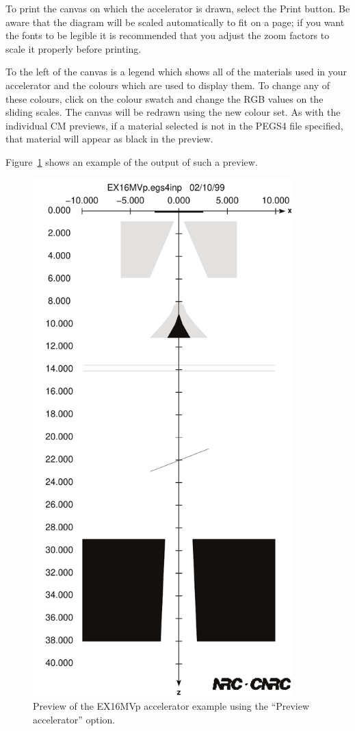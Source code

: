 \documentclass[12pt,twoside]{article}
\begin{document}
To print the canvas on which the accelerator is drawn, select the {\sf
Print} button.  Be aware that the diagram will be scaled
automatically to fit on a page; if you want the fonts to be legible it
is recommended that you adjust the zoom factors to scale it properly
before printing.

To the left of the canvas is a legend which shows all of the materials
used in your accelerator and the colours which are used to display
them.  To change any of these colours, click on the colour swatch and
change the RGB values on the sliding scales.  The canvas will be redrawn
using the new colour set.  As with the individual CM previews, if a
material selected is not in the PEGS4 file specified, that material will
appear as black in the preview.

Figure~\ref{preview.example} shows an example of the output of such a
preview.

\begin{figure}[hp]
\begin{center}
\leavevmode
\includegraphics[width=10cm]{figures/EX16MVp_gui}
\end{center}
\caption{Preview of the EX16MVp accelerator example using the ``Preview
accelerator'' option.}
\label{preview.example}
\end{figure}
\end{document}

